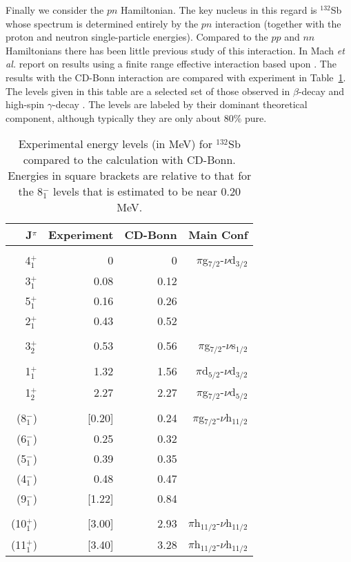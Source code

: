 \documentclass[aps,twocolumn,superscriptaddress,prc,showpacs]{revtex4}
\begin{document}
Finally we consider the $  pn  $ Hamiltonian.
The key nucleus
in this regard is $^{132}$Sb whose spectrum is determined entirely
by the $  pn  $ interaction (together with the proton and neutron
single-particle energies).
Compared to the
$  pp  $ and $  nn  $ Hamiltonians there has been
little previous study of this interaction.
In \cite{Mach95} Mach {\em et al.} report on results using a finite 
range effective interaction based upon \cite{Ero94}.
The results with the CD-Bonn interaction are compared with
experiment in Table~\ref{tab3}. The levels given in this table
are a selected set of those observed in $\beta$-decay \cite{Stone89}
and high-spin $\gamma$-decay \cite{Daley}. The levels are    
labeled by their dominant theoretical component, although
typically they are only about $80\%$ pure.   
\begingroup
\begin{table}
 \caption{\label{tab3}
Experimental energy levels (in MeV) for $^{132}$Sb compared to
the calculation with CD-Bonn.
Energies in square brackets are relative to that for the 8$^{-}_{1}$
levels that is estimated to be near 0.20 MeV.
}
\begin{ruledtabular}
\begin{tabular}{rrrr}
J$^{ \pi }$ & Experiment & CD-Bonn & Main Conf\\
\hline \\
 4$^{ + }_{1}$ &     0 &     0 & $\pi$g$_{7/2}$-$\nu$d$_{3/2}$
\\
 3$^{ + }_{1}$ &   0.08 &   0.12 & \\
 5$^{ + }_{1}$ &   0.16 &   0.26 & \\
 2$^{ + }_{1}$ &   0.43 &   0.52 & \\
\hline \\
 3$^{ + }_{2}$ &   0.53 &   0.56 & $\pi$g$_{7/2}$-$\nu$s$_{1/2}$
\\
\hline \\
 1$^{ + }_{1}$ &  1.32 &  1.56 & $\pi$d$_{5/2}$-$\nu$d$_{3/2}$
\\
 1$^{ + }_{2}$ &  2.27 &  2.27 & $\pi$g$_{7/2}$-$\nu$d$_{5/2}$
\\
\hline \\
 (8$^{-}_{1}$) & [0.20] &   0.24 &
$\pi$g$_{7/2}$-$\nu$h$_{11/2}$ \\
 (6$^{-}_{1}$) & 0.25 &   0.32 &   \\
 (5$^{-}_{1}$) & 0.39 &   0.35 &   \\
 (4$^{-}_{1}$) & 0.48 &   0.47 &  \\
 (9$^{-}_{1}$) & [1.22] &  0.84 &  \\
\hline \\
 (10$^{ + }_{1}$) & [3.00] &  2.93 &
$\pi$h$_{11/2}$-$\nu$h$_{11/2}$ \\
 (11$^{ + }_{1}$) & [3.40] &  3.28 &
$\pi$h$_{11/2}$-$\nu$h$_{11/2}$ \\
\end{tabular}
\end{ruledtabular}
\end{table}
\endgroup
\end{document}
